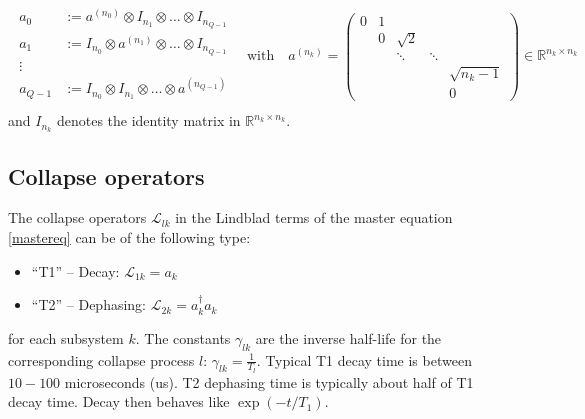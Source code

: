 \documentclass[11pt]{article}
\newcommand{\Ell}{\mathcal{L}}
\newcommand{\R}{\mathds{R}}
\begin{document}
\begin{align}
  \begin{array}{rl}
  a_0 &:= a^{(n_0)} \otimes I_{n_1} \otimes \dots \otimes
  I_{n_{Q-1}}\\
  a_1 &:= I_{n_0} \otimes a^{(n_1)} \otimes \dots \otimes
  I_{n_{Q-1}}\\
  \vdots \, & \\
  a_{Q-1} &:= I_{n_0} \otimes I_{n_1} \otimes \dots \otimes
  a^{(n_{Q-1})}\\
  \end{array}
  \quad \text{with}\quad
 a^{(n_k)} = \begin{pmatrix}
   0 & 1 &          &         &    \\
     & 0 & \sqrt{2} &         &     \\
     &   & \ddots   & \ddots  &    \\
     &   &          &         & \sqrt{n_k-1}  \\
     &   &          &         & 0   
 \end{pmatrix} \in \R^{n_k \times n_k}
\end{align}
and $I_{n_k}$ denotes the identity matrix in $\R^{n_k \times n_k}$.

\subsection{Collapse operators}
The collapse operators $\Ell_{lk}$ in the Lindblad terms of the master equation
\eqref{mastereq} can be of the following type:
\begin{itemize}
  \item ``T1'' -- Decay: $\Ell_{1k} = a_k$
  \item ``T2'' -- Dephasing: $\Ell_{2k} = a_k^{\dagger}a_k$
\end{itemize}
for each subsystem $k$. The constants $\gamma_{lk}$ are the inverse half-life
for the corresponding collapse process $l$: $\gamma_{lk} = {\frac{1}{T_l}}$.
Typical T1 decay time is between $10-100$ microseconds (us). T2
dephasing time is typically about half of T1 decay time. Decay then behaves
like $\exp(-t/{T_1})$. 
\end{document}
